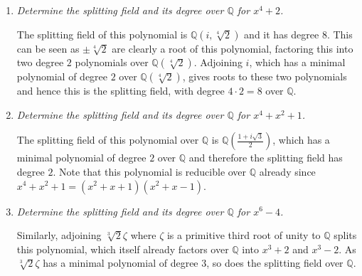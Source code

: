 \documentclass[10pt]{article}
\newcommand{\Q}{\mathbb{Q}}
\begin{document}
\begin{enumerate}
\item \emph{Determine the splitting field and its degree over $\Q$ for $x^4 + 2$.}

The splitting field of this polynomial is $\Q(i, \sqrt[4]{2})$ and it has degree $8$.  This can be seen as $\pm \sqrt[4]{2}$ are clearly a root of this polynomial, factoring this into two degree $2$ polynomials over $\Q(\sqrt[4]{2})$.  Adjoining $i$, which has a minimal polynomial of degree $2$ over $\Q(\sqrt[4]{2})$, gives roots to these two polynomials and hence this is the splitting field, with degree $4 \cdot 2 = 8$ over $\Q$.
\item \emph{Determine the splitting field and its degree over $\Q$ for $x^4+x^2+1$.}

The splitting field of this polynomial over $\Q$ is $\Q\left(\frac{1 + i\sqrt{3}}{2}\right)$, which has a minimal polynomial of degree $2$ over $\Q$ and therefore the splitting field has degree $2$.  Note that this polynomial is reducible over $\Q$ already since $x^4+x^2+1 = (x^2+x+1)(x^2+x-1)$.

\item \emph{Determine the splitting field and its degree over $\Q$ for $x^6 - 4$.}

Similarly, adjoining $\sqrt[3]{2} \zeta$ where $\zeta$ is a primitive third root of unity to $\Q$ splits this polynomial, which itself already factors over $\Q$ into $x^3+2$ and $x^3-2$.  As $\sqrt[3]{2} \zeta$ has a minimal polynomial of degree $3$, so does the splitting field over $\Q$.

\end{enumerate}
\end{document}
